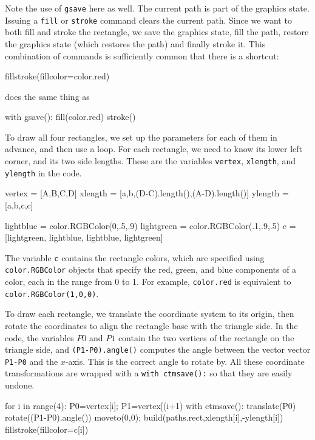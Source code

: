 \documentclass[12pt]{article}
\def\code#1{{\tt #1}}
\begin{document}
Note the use of \code{gsave} here as well.  The current path
is part of the graphics state.  Issuing a \code{fill} or \code{stroke}
command clears the current path.  Since we want to both fill and stroke
the rectangle, we save the graphics state, fill the path, restore
the graphics state (which restores the path) and finally stroke it.
This combination of commands is sufficiently common that there is a shortcut:
\begin{snippet}
fillstroke(fillcolor=color.red)
\end{snippet} 
does the same thing as
\begin{snippet}
with gsave():
  fill(color.red)
stroke()
\end{snippet}

To draw all four rectangles, we set up the parameters for
each of them in advance, and then use a loop.  For each rectangle,
we need to know its lower left corner, and its two side lengths.
These are the variables \code{vertex}, \code{xlength}, and \code{ylength}
in the code.
\begin{snippet}
vertex = [A,B,C,D]
xlength = [a,b,(D-C).length(),(A-D).length()]
ylength = [a,b,c,c]

lightblue = color.RGBColor(0,.5,.9)
lightgreen = color.RGBColor(.1,.9,.5)
c = [lightgreen, lightblue, lightblue, lightgreen]
\end{snippet}
The variable \code{c} contains the rectangle colors, which are
specified using \code{color.RGBColor} objects that specify the
red, green, and blue components of a color, each in the range from 0 to 1.
For example, \code{color.red} is equivalent to \code{color.RGBColor(1,0,0)}.

To draw each rectangle, we translate the coordinate system
to its origin, then rotate the coordinates to align the rectangle base with the triangle side.  In the code, the variables $P0$ and $P1$ contain 
the two vertices
of the rectangle on the triangle side, and \code{(P1-P0).angle()} computes 
the angle between the vector vector \code{P1-P0} and the $x$-axis.  This
is the correct angle to rotate by.  All these coordinate transformations
are wrapped with a \code{with ctmsave():} so that they are easily undone.
\begin{snippet}
for i in range(4):
  P0=vertex[i]; P1=vertex[(i+1)%
  with ctmsave():
    translate(P0)
    rotate((P1-P0).angle())
    moveto(0,0);
    build(paths.rect,xlength[i],-ylength[i])
  fillstroke(fillcolor=c[i])
\end{snippet}
\end{document}
